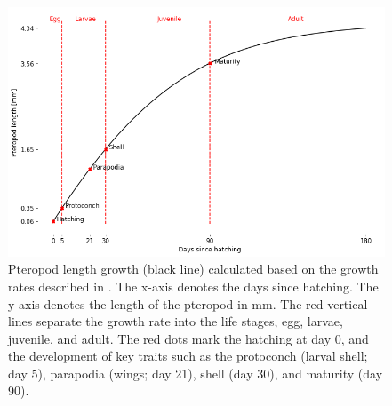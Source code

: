 \begin{figure}[tbh!]
    \centering
    
        \includegraphics[scale=0.5]{images/Optimal_growth.png}
       
    
    \caption{Pteropod length growth (black line) calculated based on the growth rates described in \cite{Wang2017Lifecycle}. The x-axis denotes the days since hatching. The y-axis denotes the length of the pteropod in mm. The red vertical lines separate the growth rate into the life stages, egg, larvae, juvenile, and adult. The red dots mark the hatching at day 0, and the development of key traits such as the protoconch (larval shell; day 5), parapodia (wings; day 21), shell (day 30), and maturity (day 90).}
    \label{fig:optimal_growth}
\end{figure}





